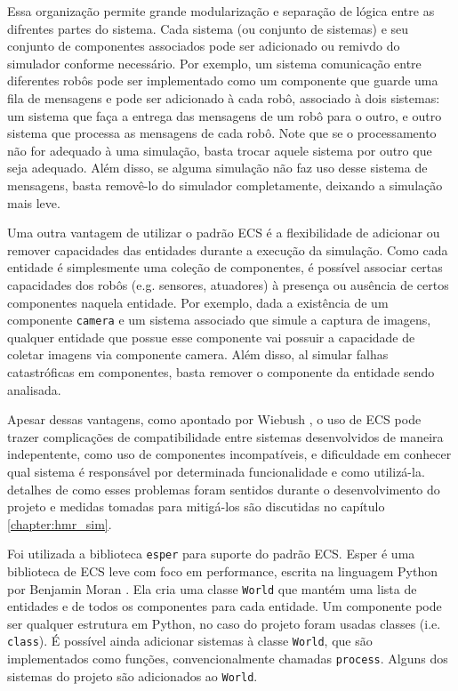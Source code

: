 Essa organização permite grande modularização e separação de lógica entre as difrentes partes do sistema. Cada sistema (ou conjunto de sistemas) e seu conjunto de componentes associados pode ser adicionado ou remivdo do simulador conforme necessário. Por exemplo, um sistema comunicação entre diferentes robôs pode ser implementado como um componente que guarde uma fila de mensagens e pode ser adicionado à cada robô, associado à dois sistemas: um sistema que faça a entrega das mensagens de um robô para o outro, e outro sistema que processa as mensagens de cada robô. Note que se o processamento não for adequado à uma simulação, basta trocar aquele sistema por outro que seja adequado. Além disso, se alguma simulação não faz uso desse sistema de mensagens, basta removê-lo do simulador completamente, deixando a simulação mais leve.

Uma outra vantagem de utilizar o padrão ECS é a flexibilidade de adicionar ou remover capacidades das entidades durante a execução da simulação. Como cada entidade é simplesmente uma coleção de componentes, é possível associar certas capacidades dos robôs (e.g. sensores, atuadores) à presença ou ausência de certos componentes naquela entidade. Por exemplo, dada a existência de um componente \texttt{camera} e um sistema associado que simule a captura de imagens, qualquer entidade que possue esse componente vai possuir a capacidade de coletar imagens via componente camera. Além disso, al simular falhas catastróficas em componentes, basta remover o componente da entidade sendo analisada.

Apesar dessas vantagens, como apontado por Wiebush \cite{wiebusch2015decoupling}, o uso de ECS pode trazer complicações de compatibilidade entre sistemas desenvolvidos de maneira indepentente, como uso de componentes incompatíveis, e dificuldade em conhecer qual sistema é responsável por determinada funcionalidade e como utilizá-la. detalhes de como esses problemas foram sentidos durante o desenvolvimento do projeto e medidas tomadas para mitigá-los são discutidas no capítulo \ref{chapter:hmr_sim}.

Foi utilizada a biblioteca \texttt{esper} para suporte do padrão ECS. Esper é uma biblioteca de ECS leve com foco em performance, escrita na linguagem Python por Benjamin Moran \cite{esper}. Ela cria uma classe \texttt{World} que mantém uma lista de entidades e de todos os componentes para cada entidade. Um componente pode ser qualquer estrutura em Python, no caso do projeto foram usadas classes (i.e. \texttt{class}). É possível ainda adicionar sistemas à classe \texttt{World}, que são implementados como funções, convencionalmente chamadas \texttt{process}. Alguns dos sistemas do projeto são adicionados ao \texttt{World}.

